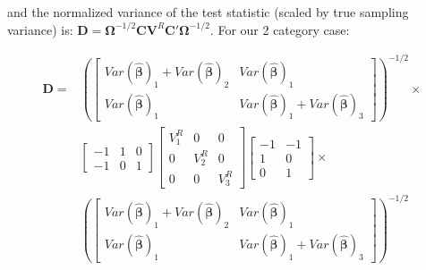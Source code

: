  
 
 
 and the normalized variance of the test statistic (scaled by true sampling variance) is:  $\mathbf{D} = \mathbf{\Omega}^{-1/2}\mathbf{C}\mathbf{V}^R\mathbf{C}'\mathbf{\Omega}^{-1/2}$. For our 2 category case: 

 \begin{equation}
    \begin{split}
       \mathbf{D} = & \left(\begin{bmatrix}
        Var(\mathbf{\hat{\beta}})_1 + Var(\mathbf{\hat{\beta}})_2 & Var(\mathbf{\hat{\beta}})_1 \\
        Var(\mathbf{\hat{\beta}})_1 & Var(\mathbf{\hat{\beta}})_1+Var(\mathbf{\hat{\beta}})_3
    \end{bmatrix} \right)^{-1/2} \times \\
     & \begin{bmatrix} 
     -1 & 1 & 0 \\
     -1 & 0 & 1
     \end{bmatrix} \begin{bmatrix}
         V^R_1 & 0 & 0 \\
         0& V^R_2 & 0  \\
         0& 0  & V^R_3  
     \end{bmatrix}
     \begin{bmatrix} 
     -1 & -1 \\
     1 & 0 \\
     0 & 1
     \end{bmatrix} \times \\
     &\left(\begin{bmatrix}
        Var(\mathbf{\hat{\beta}})_1 + Var(\mathbf{\hat{\beta}})_2 & Var(\mathbf{\hat{\beta}})_1 \\
        Var(\mathbf{\hat{\beta}})_1 & Var(\mathbf{\hat{\beta}})_1+Var(\mathbf{\hat{\beta}})_3
    \end{bmatrix} \right)^{-1/2} \\ 
    \end{split}
 \end{equation}


